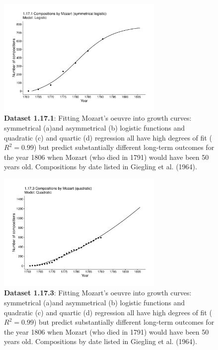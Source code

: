 \documentclass[aps,rmp,preprint,superscriptaddress,10pt,onecolumn]{article}
\begin{document}
\begin{figure}[h]
\includegraphics[width=8cm]{output/figs-ggplot/1.17.1.pdf}
\caption{\textbf{Dataset 1.17.1}: Fitting Mozart's oeuvre into growth curves: symmetrical (a)and asymmetrical (b) logistic functions and quadratic (c) and quartic (d) regression all have high degrees of fit ($R^2=0.99$) but predict substantially different long-term outcomes for the year 1806 when Mozart (who died in 1791) would have been 50 years old. Compositions by date listed in Giegling et al. (1964).}
\end{figure}
	
\begin{figure}[h]
\includegraphics[width=8cm]{output/figs-ggplot/1.17.3.pdf}
\caption{\textbf{Dataset 1.17.3}: Fitting Mozart's oeuvre into growth curves: symmetrical (a)and asymmetrical (b) logistic functions and quadratic (c) and quartic (d) regression all have high degrees of fit ($R^2=0.99$) but predict substantially different long-term outcomes for the year 1806 when Mozart (who died in 1791) would have been 50 years old. Compositions by date listed in Giegling et al. (1964).}
\end{figure}
	
\end{document}
